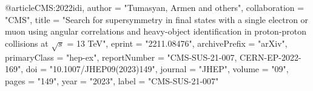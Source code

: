 @article{CMS:2022idi,
    author = "Tumasyan, Armen and others",
    collaboration = "CMS",
    title = "{Search for supersymmetry in final states with a single electron or muon using angular correlations and heavy-object identification in proton-proton collisions at $ \sqrt{s} $ = 13 TeV}",
    eprint = "2211.08476",
    archivePrefix = "arXiv",
    primaryClass = "hep-ex",
    reportNumber = "CMS-SUS-21-007, CERN-EP-2022-169",
    doi = "10.1007/JHEP09(2023)149",
    journal = "JHEP",
    volume = "09",
    pages = "149",
    year = "2023",
    label = "CMS-SUS-21-007"
}

